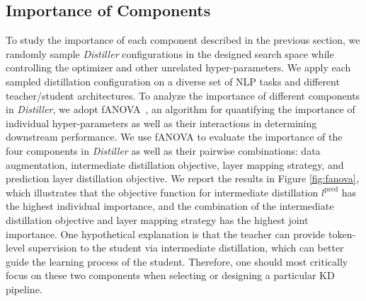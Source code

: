 \documentclass[11pt]{article}
\begin{document}
\subsection{Importance of Components}
To study the importance of each component described in the previous section, we randomly sample \emph{Distiller} configurations in the designed search space while controlling the optimizer and other unrelated hyper-parameters. We apply each sampled distillation configuration on a diverse set of NLP tasks and different teacher/student architectures. To analyze the importance of different components in \emph{Distiller}, we adopt fANOVA~\citep{hutter2014efficient}, an algorithm for quantifying the importance of individual hyper-parameters as well as their interactions in determining downstream performance. We use fANOVA to evaluate the importance of the four components in \emph{Distiller} as well as their pairwise combinations: data augmentation, intermediate distillation objective, layer mapping strategy, and prediction layer distillation objective. We report the results in Figure \ref{fig:fanova}, which illustrates that the objective function for intermediate distillation $l^{\text{pred}}$ has the highest individual importance, and the combination of the intermediate distillation objective and layer mapping strategy has the highest joint importance. One hypothetical explanation is that the teacher can provide token-level supervision to the student via intermediate distillation, which can better guide the learning process of the student. Therefore, one should most critically focus on these two components when selecting or designing a particular KD pipeline. 
\end{document}
